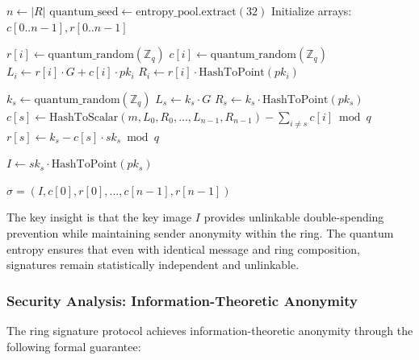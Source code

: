 \documentclass[11pt,a4paper]{article}
\begin{document}
\begin{algorithm}
\caption{Quantum-Enhanced Ring Signature Generation}
\begin{algorithmic}[1]
    \State $n \gets |R|$ 
    \State $\text{quantum\_seed} \gets \text{entropy\_pool.extract}(32)$ 
    \State Initialize arrays: $c[0..n-1], r[0..n-1]$
    
         
            \State $r[i] \gets \text{quantum\_random}(\mathbb{Z}_q)$ 
            \State $c[i] \gets \text{quantum\_random}(\mathbb{Z}_q)$ 
            \State $L_i \gets r[i] \cdot G + c[i] \cdot pk_i$ 
            \State $R_i \gets r[i] \cdot \text{HashToPoint}(pk_i)$
        \EndIf
    \EndFor
    
    \State $k_s \gets \text{quantum\_random}(\mathbb{Z}_q)$ 
    \State $L_s \gets k_s \cdot G$
    \State $R_s \gets k_s \cdot \text{HashToPoint}(pk_s)$
    \State $c[s] \gets \text{HashToScalar}(m, L_0, R_0, ..., L_{n-1}, R_{n-1}) - \sum_{i \neq s} c[i] \bmod q$
    \State $r[s] \gets k_s - c[s] \cdot sk_s \bmod q$ 
    
    \State $I \gets sk_s \cdot \text{HashToPoint}(pk_s)$ 
    
    \State \Return $\sigma = (I, c[0], r[0], ..., c[n-1], r[n-1])$
\EndProcedure
\end{algorithmic}
\end{algorithm}

The key insight is that the key image $I$ provides unlinkable double-spending prevention while maintaining sender anonymity within the ring. The quantum entropy ensures that even with identical message and ring composition, signatures remain statistically independent and unlinkable.

\subsubsection{Security Analysis: Information-Theoretic Anonymity}

The ring signature protocol achieves information-theoretic anonymity through the following formal guarantee:
\end{document}
